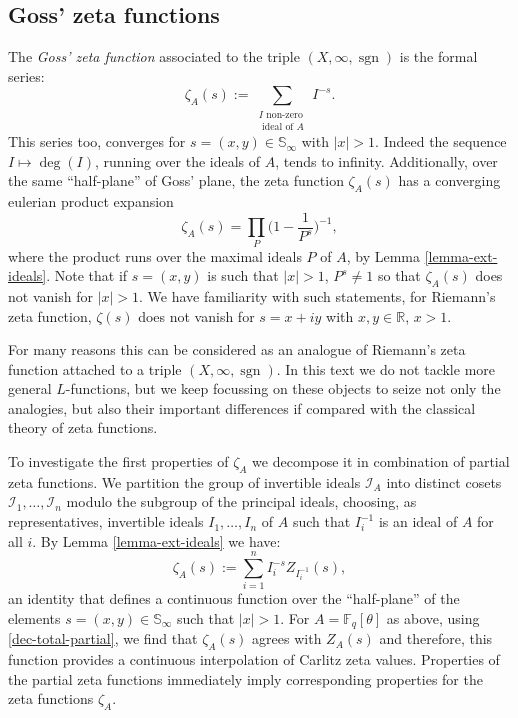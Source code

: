 \documentclass[11pt]{amsart}
\numberwithin{equation}{section}
\newcommand{\FF}{\mathbb{F}}
\newcommand{\RR}{\mathbb{R}}
\newcommand{\sgn}{\operatorname{sgn}}
\begin{document}
\subsection{Goss' zeta functions}
The {\em Goss'  zeta function} associated to the triple $(X,\infty,\sgn)$ is the formal series:
\begin{equation}\label{definition-Goss-zeta}
\zeta_A(s):=\sum_{\begin{smallmatrix}I\text{ non-zero }\\ \text{ ideal of }A\end{smallmatrix}}I^{-s}.\end{equation}
This series too, converges for $s=(x,y)\in\mathbb{S}_\infty$ with $|x|>1$. Indeed the sequence $I\mapsto \deg(I)$, running over the ideals of $A$, tends to infinity.
Additionally, over the same ``half-plane'' of Goss' plane, the zeta function $\zeta_A(s)$ 
has a converging eulerian product expansion
$$\zeta_A(s)=\prod_{P}\Big(1-\frac{1}{P^s}\Big)^{-1},$$
where the product runs over the maximal ideals $P$ of $A$, by Lemma \ref{lemma-ext-ideals}. Note that 
if $s=(x,y)$ is such that $|x|>1$, $P^s\neq1$ so that $\zeta_A(s)$ does not vanish for $|x|>1$. We have familiarity with such statements, for Riemann's zeta function, $\zeta(s)$ does not vanish for $s=x+iy$ with $x,y\in\RR$, $x>1$.

For many reasons this can be considered as an analogue of Riemann's zeta function attached to a triple $(X,\infty,\sgn)$. In this text we do not tackle more general $L$-functions, but we keep focussing on these objects to seize not only the analogies, but also their important differences if compared with the classical theory of zeta functions.

To investigate the first properties of $\zeta_A$ we decompose it in combination of partial zeta functions. We partition the group of invertible ideals $\mathcal{I}_A$ into distinct cosets $\mathcal{I}_1,\ldots,\mathcal{I}_n$ modulo 
the subgroup of the principal ideals, choosing, as representatives, invertible ideals $I_1,\ldots,I_n$ of $A$ such that $I_i^{-1}$ is an ideal of $A$ for all $i$. By Lemma \ref{lemma-ext-ideals} we have:
\begin{equation}\label{dec-total-partial}
\zeta_A(s):=\sum_{i=1}^nI_i^{-s}Z_{I_i^{-1}}(s),
\end{equation}
an identity that defines a continuous function over the ``half-plane'' of the elements $s=(x,y)\in\mathbb{S}_\infty$ such that $|x|>1$. For $A=\FF_q[\theta]$ as
above, using \eqref{dec-total-partial}, we find that 
$\zeta_A(s)$ agrees with $Z_A(s)$ and therefore, this function provides a continuous interpolation of Carlitz zeta values.
Properties of the partial zeta functions immediately imply corresponding properties for the zeta functions $\zeta_A$.
\end{document}
